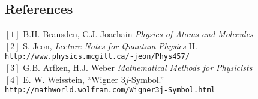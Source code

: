 \documentclass[10.5pt,letterpaper]{article}
\begin{document}
\subsection*{References}
$[1]$ B.H. Bransden, C.J. Joachain \textit{Physics of Atoms and Molecules}\\
$[2]$ S. Jeon, \textit{Lecture Notes for Quantum Physics} II. \verb|http://www.physics.mcgill.ca/~jeon/Phys457/|\\
$[3]$ G.B. Arfken, H.J. Weber \textit{Mathematical Methods for Physicists}\\
$[4]$ E. W. Weisstein, ``Wigner 3$j$-Symbol.'' \verb|http://mathworld.wolfram.com/Wigner3j-Symbol.html|
\end{document}

